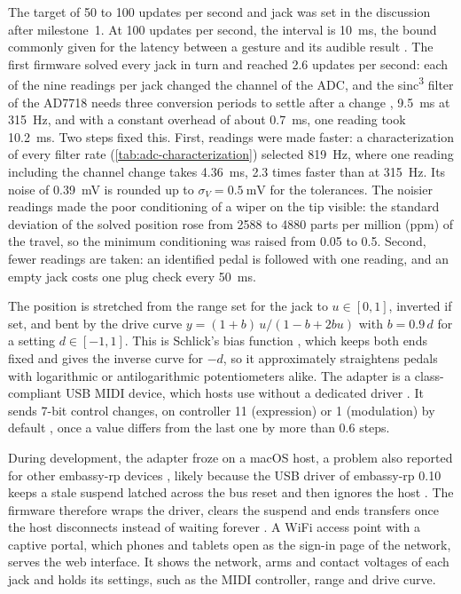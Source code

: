 The target of 50 to 100 updates per second and jack was set in the discussion after milestone~1. At 100 updates per second, the interval is \qty{10}{\milli\second}, the bound commonly given for the latency between a gesture and its audible result \cite{wessel2002problems}. The first firmware solved every jack in turn and reached 2.6 updates per second: each of the nine readings per jack changed the channel of the ADC, and the sinc\textsuperscript{3} filter of the AD7718 needs three conversion periods to settle after a change \cite{adi2001ad7718}, \qty{9.5}{\milli\second} at \qty{315}{\hertz}, and with a constant overhead of about \qty{0.7}{\milli\second}, one reading took \qty{10.2}{\milli\second}. Two steps fixed this. First, readings were made faster: a characterization of every filter rate (\cref{tab:adc-characterization}) selected \qty{819}{\hertz}, where one reading including the channel change takes \qty{4.36}{\milli\second}, 2.3 times faster than at \qty{315}{\hertz}. Its noise of \qty{0.39}{\milli\volt} is rounded up to $\sigma_V = \qty{0.5}{\milli\volt}$ for the tolerances. The noisier readings made the poor conditioning of a wiper on the tip visible: the standard deviation of the solved position rose from \num{2588} to \num{4880} parts per million (ppm) of the travel, so the minimum conditioning was raised from 0.05 to 0.5. Second, fewer readings are taken: an identified pedal is followed with one reading, and an empty jack costs one plug check every \qty{50}{\milli\second}.

The position is stretched from the range set for the jack to $u \in [0, 1]$, inverted if set, and bent by the drive curve $y = (1+b)\,u/(1 - b + 2bu)$ with $b = 0.9\,d$ for a setting $d \in [-1, 1]$. This is Schlick's bias function \cite{schlick1994bias}, which keeps both ends fixed and gives the inverse curve for $-d$, so it approximately straightens pedals with logarithmic or antilogarithmic potentiometers alike. The adapter is a class-compliant USB MIDI device, which hosts use without a dedicated driver \cite{usbif1999midi}. It sends 7-bit control changes, on controller 11 (expression) or 1 (modulation) by default \cite{midi2026controlchange}, once a value differs from the last one by more than 0.6 steps.

During development, the adapter froze on a macOS host, a problem also reported for other embassy-rp devices \cite{embassy2023issue1663}, likely because the USB driver of embassy-rp 0.10 keeps a stale suspend latched across the bus reset and then ignores the host \cite{embassy2026pr6693}. The firmware therefore wraps the driver, clears the suspend and ends transfers once the host disconnects instead of waiting forever \cite{embassy2024issue3426}. A WiFi access point with a captive portal, which phones and tablets open as the sign-in page of the network, serves the web interface. It shows the network, arms and contact voltages of each jack and holds its settings, such as the MIDI controller, range and drive curve.
